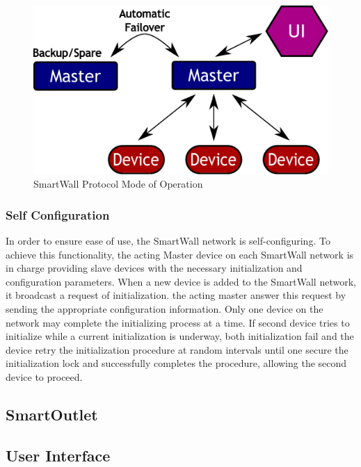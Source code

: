 \documentclass[12pt]{article}
\begin{document}
\begin{figure}
  \begin{center}
    \includegraphics[scale=.5]{networkmode.pdf}
  \end{center}
  \caption{SmartWall Protocol Mode of Operation}
  \label{fig:swMode}
\end{figure}

\subsubsection{Self Configuration}
\label{sec:Design.SmartWallProtocol.SelfConfiguration}
In order to ensure ease of use, the SmartWall network is
self-configuring. To achieve this functionality, the acting Master device
on each SmartWall network is in charge providing slave devices with
the necessary
initialization and configuration parameters. When a new device is
added to the SmartWall network, it broadcast a request of
initialization. the acting master answer this request by sending the
appropriate configuration information. Only one device on the network
may complete the initializing process at a time. If  second device
tries to initialize while a current initialization is underway, both
initialization fail and the device retry the initialization procedure at random
intervals until one secure the initialization lock and successfully
completes the procedure, allowing the second device to proceed.

\subsection{SmartOutlet}

\subsection{User Interface}
\end{document}
